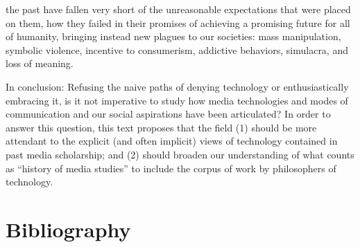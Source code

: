 \documentclass{tufte-handout}
\begin{document}
the past have fallen very short of the unreasonable expectations that
were placed on them, how they failed in their promises of achieving a
promising future for all of humanity, bringing instead new plagues to
our societies: mass manipulation, symbolic violence, incentive to
consumerism, addictive behaviors, simulacra, and loss of meaning.

In conclusion: Refusing the naive paths of denying technology or
enthusiastically embracing it, is it not imperative to study how media
technologies and modes of communication and our social aspirations have
been articulated? In order to answer this question, this text proposes
that the field (1) should be more attendant to the explicit (and often
implicit) views of technology contained in past media scholarship; and
(2) should broaden our understanding of what counts as ``history of
media studies'' to include the corpus of work by philosophers of
technology.~







\section{Bibliography}\label{bibliography}
\end{document}
